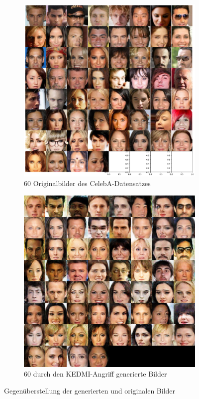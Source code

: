 \begin{figure}[H]
	\centering
	\begin{subfigure}[b]{0.35\linewidth}
		\includegraphics[width=\linewidth]{Bilder/celeba_orig.png}
		\caption{60 Originalbilder des CelebA-Datensatzes}
		\label{img:kedmi_celeba_orig}
	\end{subfigure}
	\hspace{1cm} %
	\begin{subfigure}[b]{0.348\linewidth}
		\includegraphics[width=\linewidth]{Bilder/kedmi_celeba.png}
		\caption{60 durch den \glqq KEDMI\grqq-Angriff generierte Bilder}
		\label{img:kedmi_celeba_gen}
	\end{subfigure}
	\caption{Gegenüberstellung der generierten und originalen Bilder}
	\label{img:kedmi_celeba_visuell}
\end{figure}

